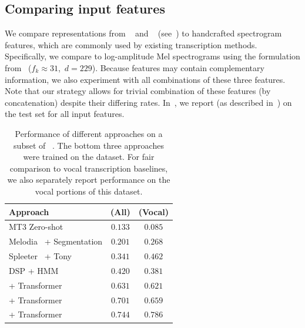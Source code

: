 \subsection{Comparing input features}
\label{sec:exp1}

We compare representations from \jukebox~\cite{dhariwal2020jukebox} and \mtthree~\cite{gardner2021mt3} (see~) to handcrafted spectrogram features, 
which are commonly used by existing transcription methods.
Specifically, we compare to log-amplitude Mel spectrograms using the formulation from~\cite{hawthorne2017onsets} (${f_k \approx 31}$,~${d = 229}$). 
Because features may contain complementary information, we also experiment with all combinations of these three features. 
Note that our \beatpooling{} strategy allows for trivial combination of these features (by concatenation) despite their differing rates. 
In~, we report \fone{} (as described in~) on the \hooktheory{} test set for all input features.

\begin{table}[t]
    \centering
    \begin{tabular}{lcc}
\toprule
Approach & \fone{} (All) & \fone{} (Vocal)\\
\midrule
MT3 Zero-shot~\cite{gardner2021mt3} & $0.133$ & $0.085$ \\
Melodia~\cite{salamon2014melody} + Segmentation & $0.201$ & $0.268$ \\
Spleeter~\cite{hennequin2020spleeter} + Tony~\cite{mauch2015computer} & $0.341$ & $\bm{0.462}$ \\
DSP + HMM~\cite{ryynanen2008automatic} & $\bm{0.420}$ & $0.381$ \\
\midrule
\mel{} + Transformer & $0.631$ & $0.621$ \\
\mtthree{} + Transformer & $0.701$ & $0.659$ \\
\jukebox{} + Transformer & $\mathbf{0.744}$ & $\mathbf{0.786}$ \\
\bottomrule
    \end{tabular}
    \caption{Performance of different approaches on a subset of \rwc~\cite{goto2002rwc,goto2003rwc,goto2004development}. The bottom three approaches were trained on the \hooktheory{} dataset. For fair comparison to vocal transcription baselines, we also separately report performance on the vocal portions of this dataset.}
    \label{tab:rwc_ryy}
    \vspace{-4mm}
\end{table}


